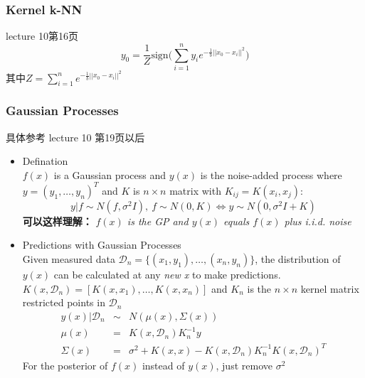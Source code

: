 \documentclass{article} 	%
\begin{document}
		\subsubsection{Kernel k-NN}
			lecture 10第16页
			$$ y_0 = \frac{1}{Z}\mathrm{sign}\big(\sum^n_{i=1}y_ie^{-\frac{1}{b}||x_0-x_i||^2}\big)$$
			其中$Z = \sum_{i=1}^n e^{-\frac{1}{b}||x_0 - x_i||^2}$
		\subsubsection{Gaussian Processes}
			具体参考 lecture 10 第19页以后
			\begin{itemize}
			\item
			Defination\\
			$f(x)$ is a Gaussian process and $y(x)$ is  the noise-added process
			where $y = (y_1,\ldots,y_n)^T$ and $K$ is $n\times n$ matrix with $K_{ij} = K(x_i,x_j)$:
			$$y|f \sim N(f,\sigma^2I),\ f\sim N(0,K) \Leftrightarrow y\sim N(0,\sigma^2I+K)$$
			\textbf{可以这样理解：    }\emph{$f (x)$ is the GP and $y(x)$ equals $f (x)$ plus i.i.d. noise}
			\item
			Predictions with Gaussian Processes\\
			Given measured data $\mathcal{D}_n = \{(x_1,y_1),\ldots,(x_n,y_n)\}$, the distribution of $y(x)$ 
			can be calculated at any \emph{new x} to make predictions.\\
			$K(x,\mathcal{D}_n) = [K(x,x_1),\ldots,K(x,x_n)]$ and $K_n$ is the $n\times n$ kernel matrix 
			restricted points in $\mathcal{D}_n$
				\begin{eqnarray}
				y(x)|\mathcal{D}_n  &\sim& N(\mu(x),\Sigma(x))\\
				\mu(x) &=& K(x,\mathcal{D}_n)K_n^{-1}y\\
				\Sigma(x) &=& \sigma^2 + K(x,x) - K(x,\mathcal{D}_n) K_n^{-1} K(x,\mathcal{D}_n)^T
				\end{eqnarray}
			For the posterior of $f(x)$ instead of $y(x)$, just remove $\sigma^2$
			\end{itemize}
	
			
	
	
			
		
	
\end{document}
